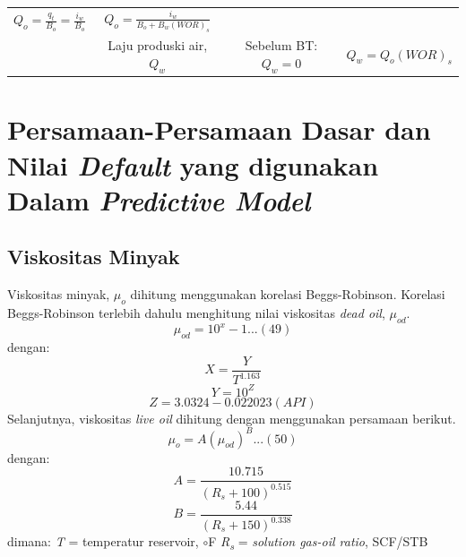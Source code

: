 \documentclass[
]{book}
\begin{document}
\begin{longtable}[]{@{}cccc@{}}
\begin{minipage}[t]{0.22\columnwidth}
\(Q_o = \frac{q_t}{B_o}=\frac{i_w}{B_o}\)\strut
\end{minipage} & \begin{minipage}[t]{0.22\columnwidth}\centering
\(Q_o=\frac{i_w}{B_o+B_w(WOR)_s}\)\strut
\end{minipage}\tabularnewline
\begin{minipage}[t]{0.22\columnwidth}\centering
13\strut
\end{minipage} & \begin{minipage}[t]{0.22\columnwidth}\centering
Laju produski air, \(Q_w\)\strut
\end{minipage} & \begin{minipage}[t]{0.22\columnwidth}\centering
Sebelum BT: \(Q_w = 0\)\strut
\end{minipage} & \begin{minipage}[t]{0.22\columnwidth}\centering
\(Q_w = Q_o(WOR)_s\)\strut
\end{minipage}\tabularnewline
\bottomrule
\end{longtable}

\hypertarget{persamaan-persamaan-dasar-dan-nilai-default-yang-digunakan-dalam-predictive-model}{%
\section{\texorpdfstring{Persamaan-Persamaan Dasar dan Nilai \emph{Default} yang digunakan Dalam \emph{Predictive Model}}{Persamaan-Persamaan Dasar dan Nilai Default yang digunakan Dalam Predictive Model}}\label{persamaan-persamaan-dasar-dan-nilai-default-yang-digunakan-dalam-predictive-model}}

\hypertarget{viskositas-minyak}{%
\subsection{Viskositas Minyak}\label{viskositas-minyak}}

Viskositas minyak, \(\mu_o\) dihitung menggunakan korelasi Beggs-Robinson. Korelasi Beggs-Robinson terlebih dahulu menghitung nilai viskositas \emph{dead oil}, \(\mu_{od}\).
\[\mu_{od}=10^x-1...(49)\]
dengan:
\[X = \frac{Y}{T^{1.163}}\]
\[Y=10^Z\]
\[Z=3.0324-0.022023(API)\]
Selanjutnya, viskositas \emph{live oil} dihitung dengan menggunakan persamaan berikut.
\[\mu_o= A(\mu_{od})^B...(50)\]
dengan:
\[A=\frac{10.715}{(R_s + 100)^{0.515}}\]
\[B = \frac{5.44}{(R_s + 150)^{0.338}}\]
dimana:
\emph{T} = temperatur reservoir, \(\circ\)F
\emph{R\textsubscript{s}} = \emph{solution gas-oil ratio}, SCF/STB
\end{document}
